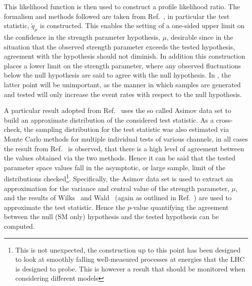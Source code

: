 \documentclass[floatfix]{article}
\begin{document}
This likelihood function is then used to construct a profile likelihood ratio. The formalism and methods followed are taken from 
Ref.~\cite{Cowan:2010js}, in particular the test statistic, $\tilde{q}_{\mu}$ is constructed. This enables the setting of a one-sided upper limit on the confidence 
in the strength parameter hypothesis, $\mu$, desirable since in the situation that the observed strength parameter exceeds the tested hypothesis, agreement with 
the hypothesis should not diminish. In addition this construction places a lower limit on the strength parameter, where any observed fluctuations below the null 
hypothesis are said to agree with the null hypothesis. In \Contur, the latter point will be unimportant, as the manner in which samples are 
generated and tested will only increase the event rates with respect to the null hypothesis. 

A particular result adopted from Ref.~\cite{Cowan:2010js} uses the so called Asimov data set to build an approximate distribution of the considered test statistic. 
As a cross-check, the sampling distribution for the test statistic was also estimated via Monte Carlo methods for multiple individual tests of various channels, 
in all cases the result from Ref.~\cite{Cowan:2010js} is observed, that there is a high level of agreement between the values obtained via the two methods. Hence it can be said
that the tested parameter space values fall in the asymptotic, or large sample, limit of the distributions checked\footnote{This is not unexpected, the
construction up to this point has been designed to look at smoothly falling well-measured processes at energies that the LHC is designed to probe. This is however a 
result that should be monitored when considering different models}. Specifically, the Asimov data set is used to extract an approximation for the variance and central value of the strength parameter, $\mu$, and the results of Wilks~\cite{Wilks:1938dza} and Wald~\cite{Wald:1943:EWM} (again as outlined in Ref.~\cite{Cowan:2010js}) 
are used to approximate the test statistic. 
Hence the $p$-value quantifying the agreement between the null (SM only) hypothesis and the tested hypothesis can be computed. 
\end{document}

